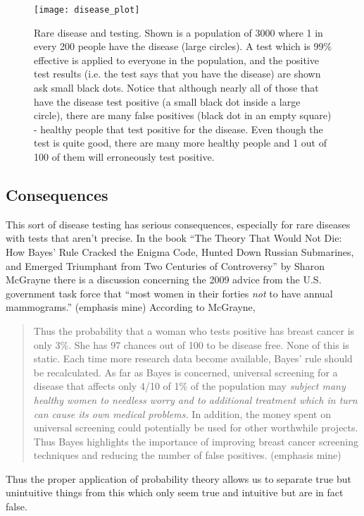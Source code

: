 \begin{figure*}
\texttt{[image: disease\_plot]}
\caption{Rare disease and testing.  Shown is a population of 3000 where 1 in every 200 people have the disease (large circles).  A test which is 99\% effective is applied to everyone in the population, and the positive test results (i.e. the test says that you have the disease) are shown ask small black dots. Notice that although nearly all of those that have the disease test positive (a small black dot inside a large circle), there are many false positives (black dot in an empty square) - healthy people that test positive for the disease.  Even though the test is quite good, there are many more healthy people and 1 out of 100 of them will erroneously test positive.}\label{fig:disease}
\end{figure*}

\subsection{Consequences}

This sort of disease testing has serious consequences, especially for rare diseases with tests that aren't precise.  In the book ``The Theory That Would Not Die: How Bayes' Rule Cracked the Enigma Code, Hunted Down Russian Submarines, and Emerged Triumphant from Two Centuries of Controversy'' by Sharon McGrayne there is a discussion concerning the 2009 advice from the U.S. government task force that ``most women in their forties {\em not} to have annual mammograms.'' (emphasis mine)  According to McGrayne,
\begin{quotation}
Thus the probability that a woman who tests positive has breast cancer is only 3\%. She has 97 chances out of 100 to be disease free.
None of this is static. Each time more research data become available, Bayes' rule should be recalculated. As far as Bayes is concerned, universal screening for a disease that affects only 4/10 of 1\% of the population may {\em subject many healthy women to needless worry and to additional treatment which in turn can cause its own medical problems.} In addition, the money spent on universal screening could potentially be used for other worthwhile projects. Thus Bayes highlights the importance of improving breast cancer screening techniques and reducing the number of false positives.\cite{McGrayne:2011fk} (emphasis mine)
\end{quotation}

Thus the proper application of probability theory allows us to separate true but unintuitive things from this which only seem true and intuitive but are in fact false. 

